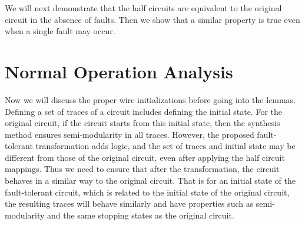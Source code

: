 \documentclass[12pt]{report}
\begin{document}

We will next demonstrate that the half circuits are equivalent to the original circuit in the absence of faults.  Then we show that a similar property is true even when a single fault may occur.

\section{Normal Operation Analysis}
Now we will discuss the proper wire initializations before going into the lemmas.  Defining a set of traces of a circuit includes defining the initial state.  For the original circuit, if the circuit starts from this initial state, then the synthesis method ensures semi-modularity in all traces.  However, the proposed fault-tolerant transformation adds logic, and the set of traces and initial state may be different from those of the original circuit, even after applying the half circuit mappings.  Thus we need to ensure that after the transformation, the circuit behaves in a similar way to the original circuit.  That is for an initial state of the fault-tolerant circuit, which is related to the initial state of the original circuit, the resulting traces will behave similarly and have properties such as semi-modularity and the same stopping states as the original circuit. \\
\end{document}
